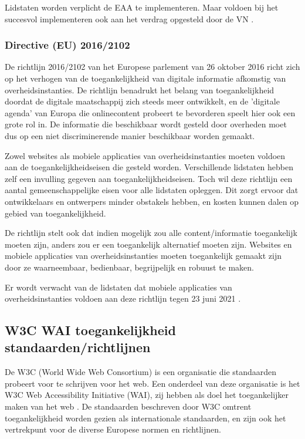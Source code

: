 Lidstaten worden verplicht de EAA te implementeren. Maar voldoen bij het succesvol implementeren ook aan het verdrag opgesteld door de VN \autocite{eaa2015}.



\subsubsection{Directive (EU) 2016/2102}
De richtlijn 2016/2102 van het Europese parlement van 26 oktober 2016 richt zich op het verhogen van de toegankelijkheid van digitale informatie afkomstig van overheidsinstanties. De richtlijn benadrukt het belang van toegankelijkheid doordat de digitale maatschappij zich steeds meer ontwikkelt, en de 'digitale agenda' van Europa die onlinecontent probeert te bevorderen speelt hier ook een grote rol in. De informatie die beschikbaar wordt gesteld door overheden moet dus op een niet discriminerende manier beschikbaar worden gemaakt. 

Zowel websites als mobiele applicaties van overheidsinstanties moeten voldoen aan de toegankelijkheidseisen die gesteld worden. Verschillende lidstaten hebben zelf een invulling gegeven aan toegankelijkheidseisen. Toch wil deze richtlijn een aantal gemeenschappelijke eisen voor alle lidstaten opleggen. Dit zorgt ervoor dat ontwikkelaars en ontwerpers minder obstakels hebben, en kosten kunnen dalen op gebied van toegankelijkheid.

De richtlijn stelt ook dat indien mogelijk zou alle content/informatie toegankelijk moeten zijn, anders zou er een toegankelijk alternatief moeten zijn. Websites en mobiele applicaties van overheidsinstanties moeten toegankelijk gemaakt zijn door ze waarneembaar, bedienbaar, begrijpelijk en robuust te maken.
 
Er wordt verwacht van de lidstaten dat mobiele applicaties van overheidsinstanties voldoen aan deze richtlijn tegen 23 juni 2021 \autocite{directive2016}.

\subsection{W3C WAI toegankelijkheid standaarden/richtlijnen}
\label{sec:standaarden}
De W3C (World Wide Web Consortium) is een organisatie die standaarden probeert voor te schrijven voor het web. Een onderdeel van deze organisatie is het W3C Web Accessibility Initiative (WAI), zij hebben als doel het toegankelijker maken van het web
 \autocite{introAccesibilityw3c}. De standaarden beschreven door W3C omtrent toegankelijkheid worden gezien als internationale standaarden, en zijn ook het vertrekpunt voor de diverse Europese normen en richtlijnen.
 
